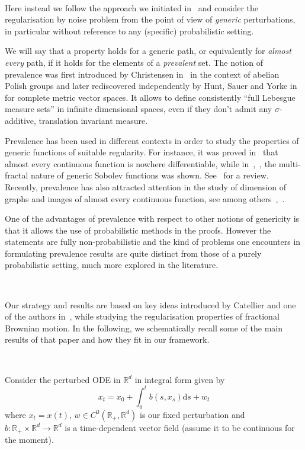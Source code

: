 \documentclass[10pt]{article}
\newcommand{\mathd}{\mathrm{d}}
\newcommand{\tmtextit}[1]{{\itshape{#1}}}
\begin{document}
\

Here instead we follow the approach we initiated
in~{\cite{galeatigubinelli_ode}} and consider the regularisation by noise
problem from the point of view of \tmtextit{generic} perturbations, in
particular without reference to any (specific) probabilistic setting.

We will say that a property holds for a generic path, or equivalently for
\tmtextit{almost every} path, if it holds for the elements of a
\tmtextit{prevalent} set. The notion of prevalence was first introduced by
Christensen in~{\cite{christensen}} in the context of abelian Polish groups
and later rediscovered independently by Hunt, Sauer and Yorke
in~{\cite{huntsauer}} for complete metric vector spaces. It allows to define
consistently ``full Lebesgue measure sets'' in infinite dimensional spaces,
even if they don't admit any $\sigma$-additive, translation invariant measure.

Prevalence has been used in different contexts in order to study the
properties of generic functions of suitable regularity. For instance, it was
proved in~{\cite{hunt}} that almost every continuous function is nowhere
differentiable, while in~{\cite{fraysse2010}},~{\cite{fraysse2006}}, the
multi-fractal nature of generic Sobolev functions was shown. See~{\cite{ott}}
for a review. Recently, prevalence has also attracted attention in the study
of dimension of graphs and images of almost every continuous function, see
among others~{\cite{fraserhyde}},~{\cite{bayart}}.

One of the advantages of prevalence with respect to other notions of
genericity is that it allows the use of probabilistic methods in the proofs.
However the statements are fully non-probabilistic and the kind of problems
one encounters in formulating prevalence results are quite distinct from those
of a purely probabilistic setting, much more explored in the literature.

\

Our strategy and results are based on key ideas introduced by Catellier and
one of the authors in~{\cite{catelliergubinelli}}, while studying the
regularisation properties of fractional Brownian motion. In the following, we
schematically recall some of the main results of that paper and how they fit
in our framework.

\

Consider the perturbed ODE in $\mathbb{R}^d$ in integral form given by
\begin{equation}
  \label{eq:pert-ode} x_t = x_0 + \int_0^t b (s, x_s) \mathd s + w_t
\end{equation}
where $x_t = x (t)$, $w \in C^0 (\mathbb{R}_+, \mathbb{R}^d)$ is our fixed
perturbation and $b : \mathbb{R}_+ \times \mathbb{R}^d \rightarrow
\mathbb{R}^d$ is a time-dependent vector field (assume it to be continuous for
the moment).
\end{document}
